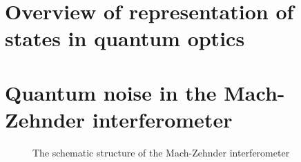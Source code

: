 \documentclass[hyperref, a4paper]{article}
\begin{document}
\section{Overview of representation of states in quantum optics}\label{sec:overview-rep}



\section{Quantum noise in the Mach-Zehnder interferometer}\label{sec:interferometer}

\begin{figure}
    \centering
    
    \caption{The schematic structure of the Mach-Zehnder interferometer}
    \label{fig:mz-inter}
\end{figure}
\end{document}
